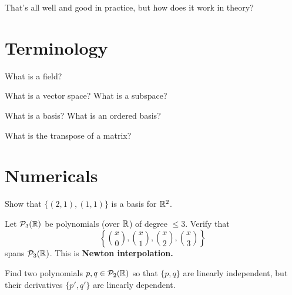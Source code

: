 \documentclass{homework}
\author{Jim Fowler}
\begin{document}
\maketitle

\begin{inspiration}
That's all well and good in practice, but how does it work in theory?
\end{inspiration}

\section{Terminology}

\begin{problem}
  What is a field?
\end{problem}

\begin{problem}
  What is a vector space?  What is a subspace?
\end{problem}

\begin{problem}
  What is a basis?  What is an ordered basis?
\end{problem}

\begin{problem}\label{transpose-definition}What is the transpose of a matrix?
\end{problem}

\section{Numericals}

\begin{problem}
  Show that $\{ (2,1), (1,1) \}$ is a basis for $\mathbb{R}^2$.
\end{problem}

\begin{problem}\label{newton-interpolation}
  Let $\mathcal{P}_{3}(\mathbb{R})$ be polynomials (over $\mathbb{R}$) of degree $\leq 3$.  Verify that
  \[ \left\{ \binom{x}{0}, \binom{x}{1}, \binom{x}{2}, \binom{x}{3} \right\} \]
  spans $\mathcal{P}_{3}(\mathbb{R})$.  This is \textbf{Newton interpolation.}
\end{problem}

\begin{problem}
  Find two polynomials $p,q \in \mathcal{P}_{2}(\mathbb{R})$ so that $\{p,q\}$ are linearly independent, but their derivatives $\{p',q'\}$ are linearly dependent.
\end{problem}
\end{document}

